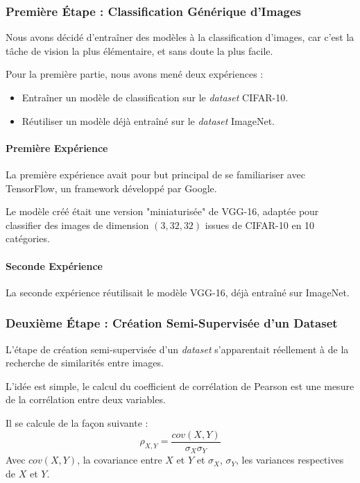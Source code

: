 \documentclass[a4paper, 11pt]{report}
\begin{document}
\subsubsection{Première Étape : Classification Générique d'Images}
Nous avons décidé d'entraîner des modèles à la classification d'images, car c'est la tâche de vision la plus élémentaire, et sans doute la plus facile.

Pour la première partie, nous avons mené deux expériences :
\begin{itemize}
	\item Entraîner un modèle de classification sur le \emph{dataset} CIFAR-10.
	\item Réutiliser un modèle déjà entraîné sur le \emph{dataset} ImageNet.
\end{itemize}

\paragraph{Première Expérience}
La première expérience avait pour but principal de se familiariser avec TensorFlow, un framework développé par Google.

Le modèle créé était une version "miniaturisée" de VGG-16, adaptée pour classifier des images de dimension $(3, 32, 32)$ issues de CIFAR-10 en 10 catégories.

\paragraph{Seconde Expérience}
La seconde expérience réutilisait le modèle VGG-16, déjà entraîné sur ImageNet.

\subsubsection{Deuxième Étape : Création Semi-Supervisée d'un Dataset}
L'étape de création semi-supervisée d'un \emph{dataset} s'apparentait réellement à de la recherche de similarités entre images.

L'idée est simple, le calcul du coefficient de corrélation de Pearson  est une mesure de la corrélation entre deux variables.

Il se calcule de la façon suivante :
$$\rho_{X,Y} = \frac{cov(X,Y)}{\sigma_X \sigma_Y}$$
Avec $cov(X,Y)$, la covariance entre $X$ et $Y$ et $\sigma_X$, $\sigma_Y$, les variances respectives de $X$ et $Y$.
\end{document}
